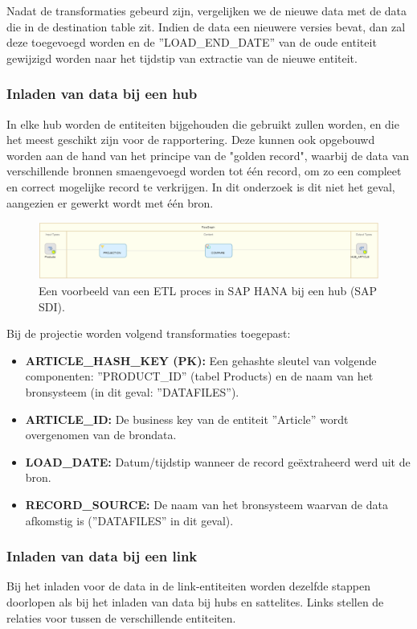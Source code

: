 Nadat de transformaties gebeurd zijn, vergelijken we de nieuwe data met de data die in de destination table zit. Indien de data een nieuwere versies bevat, dan zal deze toegevoegd worden en de ''LOAD\_END\_DATE'' van de oude entiteit gewijzigd worden naar het tijdstip van extractie van de nieuwe entiteit.

\subsubsection{Inladen van data bij een hub}
In elke hub worden de entiteiten bijgehouden die gebruikt zullen worden, en die het meest geschikt zijn voor de rapportering. Deze kunnen ook opgebouwd worden aan de hand van het principe van de "golden record", waarbij de data van verschillende bronnen smaengevoegd worden tot één record, om zo een compleet en correct mogelijke record te verkrijgen. In dit onderzoek is dit niet het geval, aangezien er gewerkt wordt met één bron. 

\begin{figure}[h]
	\centering
	\includegraphics[scale=0.45]{../images/DV_FG_hub.png}
	\caption{Een voorbeeld van een ETL proces in SAP HANA bij een hub (SAP SDI).}
	\label{fig:etlhub}
\end{figure}

Bij de projectie worden volgend transformaties toegepast:

\begin{itemize}
	\item \textbf{ARTICLE\_HASH\_KEY (PK):} Een gehashte sleutel van volgende componenten: ''PRODUCT\_ID'' (tabel Products) en de naam van het bronsysteem (in dit geval: ''DATAFILES'').
	\item \textbf{ARTICLE\_ID:} De business key van de entiteit ''Article'' wordt overgenomen van de brondata.
	\item \textbf{LOAD\_DATE:} Datum/tijdstip wanneer de record geëxtraheerd werd uit de bron.
	\item \textbf{RECORD\_SOURCE:} De naam van het bronsysteem waarvan de data afkomstig is (''DATAFILES'' in dit geval).
\end{itemize}

\subsubsection{Inladen van data bij een link}
Bij het inladen voor de data in de link-entiteiten worden dezelfde stappen doorlopen als bij het inladen van data bij hubs en sattelites. Links stellen de relaties voor tussen de verschillende entiteiten. 


